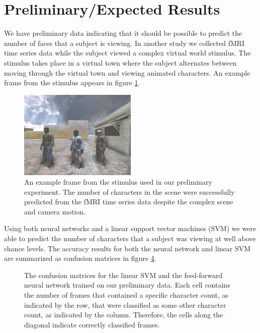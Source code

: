 \documentclass[12pt]{article}
\begin{document}
\section{Preliminary/Expected Results}
We have preliminary data indicating that it should be possible to predict the number of faces that a subject is viewing.
In another study we collected fMRI time series data while the subject viewed a complex virtual world stimulus.
The stimulus takes place in a virtual town where the subject alternates between moving through the virtual town and viewing animated characters.
An example frame from the stimulus appears in figure \ref{fig:preliminary-data-frame}.
\begin{figure}
\centering
\includegraphics[width=0.5\textwidth]{figures/preliminary-data-frame}
\caption{An example frame from the stimulus used in our preliminary experiment.
The number of characters in the scene were successfully predicted from the fMRI time series data despite the complex scene and camera motion.}
\label{fig:preliminary-data-frame}
\end{figure}
Using both neural networks and a linear support vector machines (SVM) we were able to predict the number of characters that a subject was viewing at well above chance levels.
The accuracy results for both the neural network and linear SVM are summarized as confusion matrices in figure \ref{fig:preliminary-data-confusion}.
\begin{figure}
\centering
\begin{subfigure}{\textwidth}
\centering

\caption{}
\label{fig:svm-confusion}
\end{subfigure}
\begin{subfigure}{\textwidth}
\centering

\caption{}
\label{fig:nn-confusion}
\end{subfigure}
\caption{The confusion matrices for the  linear SVM and the  feed-forward neural network trained on our preliminary data.
Each cell contains the number of frames that contained a specific character count, as indicated by the row, that were classified as some other character count, as indicated by the column.
Therefore, the cells along the diagonal indicate correctly classified frames.}
\label{fig:preliminary-data-confusion}
\end{figure}
\end{document}
